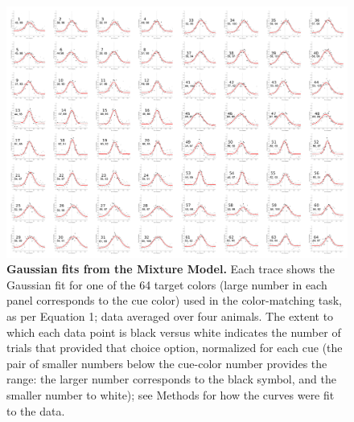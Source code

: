 \begin{figure}
    \centering
    \begin{fullwidth}
    \includegraphics[width=\textwidth+4cm]{../Figures/flat/SI3_MMBreakOut_2.jpg}
    \caption{\textbf{Gaussian fits from the Mixture Model.}
    Each trace shows the Gaussian fit for one of the 64 target colors (large number in each panel corresponds to the cue color) used in the color-matching task, as per Equation 1; data averaged over four animals. The extent to which each data point is black versus white indicates the number of trials that provided that choice option, normalized for each cue (the pair of smaller numbers below the cue-color number provides the range: the larger number corresponds to the black symbol, and the smaller number to white); see Methods for how the curves were fit to the data. 
    } 
    \label{fig:MMBreakOut}
    \end{fullwidth}
\end{figure}

